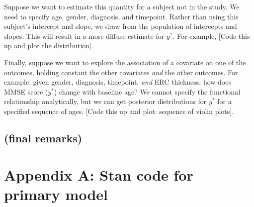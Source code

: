 \documentclass[12pt]{article}
\begin{document}
Suppose we want to estimate this quantity for a subject not in the study. We need to specify age, gender, diagnosis, and timepoint. Rather than using this subject's intercept and slope, we draw from the population of intercepts and slopes. This will result in a more diffuse estimate for $y^*$. For example, {\color{teal} [Code this up and plot the distribution].}

Finally, suppose we want to explore the association of a covariate on one of the outcomes, holding constant the other covariates \emph{and} the other outcomes. For example, given gender, diagnosis, timepoint, \emph{and} ERC thickness, how does MMSE score ($y^*$) change with baseline age? We cannot specify the functional relationship analytically, but we can get posterior distributions for $y^*$ for a specified sequence of ages. {\color{teal} [Code this up and plot: sequence of violin plots].}

\subsection{(final remarks)}

\pagebreak
\section{Appendix A: Stan code for primary model}
\end{document}

